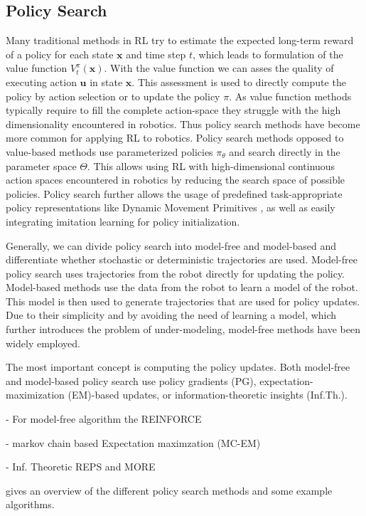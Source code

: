 \subsection{Policy Search}
Many traditional methods in RL try to estimate the
expected long-term reward of a policy for each state $\mathbf{x}$
and time step $t$, which leads to formulation of the value function $V^{\pi}_t(\mathbf{x})$.
With the value function we can asses the quality of executing action
$\mathbf{u}$ in state $\mathbf{x}$. This assessment is used
to directly compute the policy by action selection or to update
the policy $\pi$. As value function methods typically require
to fill the complete action-space they struggle with
the high dimensionality encountered in robotics.
Thus policy search methods have become more common
for applying RL to robotics.
Policy search methods opposed to value-based methods
use parameterized policies $\pi_{\theta}$ and search
directly in the parameter space $\Theta$. This allows using RL with
high-dimensional continuous action spaces encountered
in robotics by reducing the search space of possible policies.
Policy search further allows the usage of predefined
task-appropriate policy representations like Dynamic
Movement Primitives \citep{schaal2005learning}, as well
as easily integrating imitation learning
for policy initialization.

Generally, we can divide policy search into model-free and model-based and
differentiate whether stochastic or deterministic trajectories are used.
Model-free policy search uses trajectories from the robot directly
for updating the policy. Model-based methods use the data
from the robot to learn a model of the robot. This model is then used
to generate trajectories that are used for policy updates.
Due to their simplicity and by avoiding the need of learning a model,
which further introduces the problem of under-modeling,
model-free methods have been widely employed.

The most important concept is computing the policy updates.
Both model-free and model-based policy search use policy gradients (PG),
expectation-maximization (EM)-based updates, or
information-theoretic insights (Inf.Th.).

- For model-free algorithm the REINFORCE

- markov chain based Expectation maximzation (MC-EM)

- Inf. Theoretic REPS and MORE

gives an overview of the different policy search methods
and some example algorithms.


